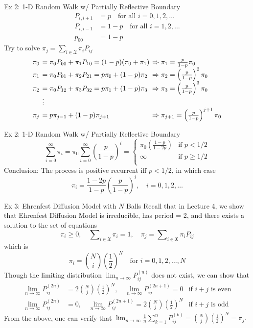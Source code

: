 \documentclass[letterpaper,handout, mathserif]{beamer}
\def\Sum{\sum\nolimits}
\def\X{\mathfrak{X}}
\begin{document}
\begin{frame}{Ex 2: 1-D Random Walk w/ Partially Reflective Boundary}
\bigskip
\begin{align*}
P_{i,i+1}&=p\quad\mbox{for all }i=0,1,2,\ldots\\
P_{i,i-1}&=1-p\quad\mbox{for all }i=1,2,\ldots\\
p_{00}&=1-p
\end{align*}
Try to solve $\pi_j=\Sum_{i\in\X}\pi_iP_{ij}$
$$\arraycolsep=2pt
\begin{array}{cll}
\pi_0&=\pi_0P_{00}+\pi_1 P_{10}=(1-p)(\pi_0+\pi_1)&\Rightarrow\pi_1=\frac{p}{1-p}\pi_0\\
\pi_1&=\pi_0P_{01}+\pi_2 P_{21}=p\pi_0+(1-p)\pi_2&\Rightarrow\pi_2=\left(\frac{p}{1-p}\right)^2\pi_0\\
\pi_2&=\pi_0P_{12}+\pi_3 P_{32}=p\pi_1+(1-p)\pi_3&\Rightarrow\pi_3=\left(\frac{p}{1-p}\right)^3\pi_0\\
&\vdots&\\
\pi_{j}&=p\pi_{j-1}+(1-p)\pi_{j+1}&\Rightarrow\pi_{j+1}=\left(\frac{p}{1-p}\right)^{j+1}\pi_0
\end{array}
$$
\end{frame}
\begin{frame}{Ex 2: 1-D Random Walk w/ Partially Reflective Boundary}
$$
\sum_{i=0}^{\infty}\pi_i=\pi_0\sum_{i=0}^{\infty}\left(\frac{p}{1-p}\right)^{i}=
\begin{cases}
\pi_0\left(\frac{1-p}{1-2p}\right)&\mbox{if }p<1/2\\
\infty&\mbox{if }p\ge 1/2\\
\end{cases}
$$
Conclusion: The process is positive recurrent iff $p<1/2$, in which case
$$
\pi_i=\frac{1-2p}{1-p}\left(\frac{p}{1-p}\right)^i,\quad i=0,1,2,\ldots
$$
\end{frame}
\begin{frame}{Ex 3: Ehrenfest Diffusion Model with $N$ Balls}
Recall that in Lecture 4, we
show that Ehrenfest Diffusion Model is irreducible, has period = 2,
and there exists a solution to the set of equations
$$
\pi_i\ge 0,\quad\Sum_{i\in\X}\pi_i=1,\quad\pi_j=\Sum_{i\in\X}\pi_i P_{ij}
$$
which is
$$
\pi_i={N\choose i}\left(\frac{1}{2}\right)^{N}\quad\text{for }i=0,1,2,\ldots,N
$$
Though the limiting distribution $\lim_{n\to\infty}P^{(n)}_{ij}$ does not exist,
we can show that
\begin{align*}
\lim_{n\to\infty}P^{(2n)}_{ij}&= 2{N\choose j}(\frac{1}{2})^{N},\quad \lim_{n\to\infty}P^{(2n+1)}_{ij}=0&\text{if $i+j$ is even}\\
\lim_{n\to\infty}P^{(2n)}_{ij}&= 0,\quad \lim_{n\to\infty}P^{(2n+1)}_{ij}=2{N\choose j}(\frac{1}{2})^{N}&\text{if $i+j$ is odd}
\end{align*}
From the above, one can verify that $\lim_{n\to\infty}\frac{1}{n}\Sum_{k=1}^n P^{(k)}_{ij}={N\choose j}(\frac{1}{2})^{N}=\pi_j.$
\end{frame}
\end{document}
